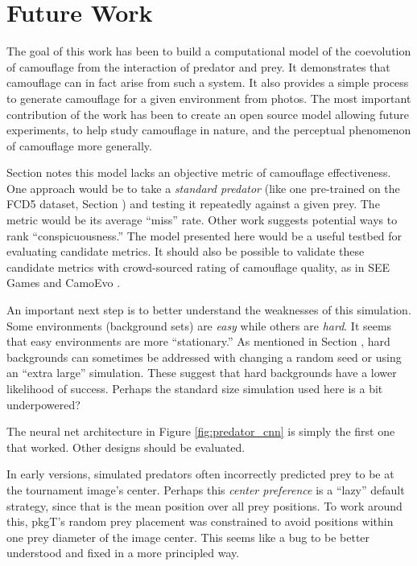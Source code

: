 \documentclass[letterpaper]{article}
\newcommand{\jargon}[1]{\textit{#1}}
\newcommand{\texsyn}[0]{pkgT}
\begin{document}
\section{Future Work}
The goal of this work has been to build a computational model of the coevolution of camouflage from the interaction of predator and prey. It demonstrates that camouflage can in fact arise from such a system. It also provides a simple process to generate camouflage for a given environment from photos. The most important contribution of the work has been to create an open source model allowing future experiments, to help study camouflage in nature, and the perceptual phenomenon of camouflage more generally.
\par
Section  notes this model lacks an objective metric of camouflage effectiveness. One approach would be to take a \jargon{standard predator} (like one pre-trained on the FCD5 dataset, Section ) and testing it repeatedly against a given prey. The metric would be its average “miss” rate. Other work \cite{lv_cod_2022} suggests potential ways to rank “conspicuousness.” The model presented here would be a useful testbed for evaluating candidate metrics. It should also be possible to validate these candidate metrics with crowd-sourced rating of camouflage quality, as in SEE Games \cite{stevens_games_2022} and CamoEvo \cite{hancock_camoevo_2022}.
\par
An important next step is to better understand the weaknesses of this simulation. Some environments (background sets) are \textit{easy} while others are \textit{hard}. It seems that easy environments are more “stationary.” As mentioned in Section , hard backgrounds can sometimes be addressed with changing a random seed or using an “extra large” simulation. These suggest that hard backgrounds have a lower likelihood of success. Perhaps the standard size simulation used here is a bit underpowered?
\par
The neural net architecture in Figure \ref{fig:predator_cnn} is simply the first one that worked. Other designs should be evaluated.
\par
In early versions, simulated predators often incorrectly predicted prey to be at the tournament image's center. Perhaps this \jargon{center preference} is a “lazy” default strategy, since that is the mean position over all prey positions. To work around this, \texsyn{}'s random prey placement was constrained to avoid positions within one prey diameter of the image center. This seems like a bug to be better understood and fixed in a more principled way.
\end{document}
